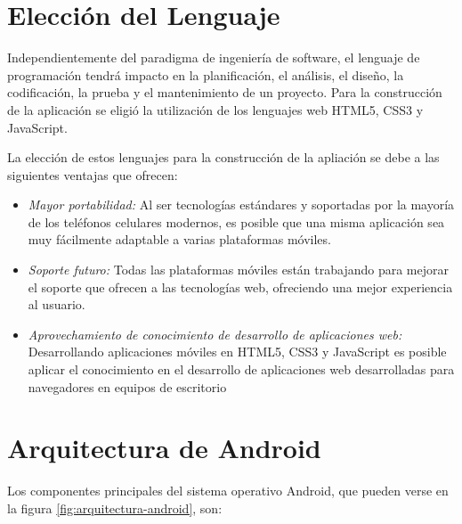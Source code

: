 \section{Elección del Lenguaje}

    Independientemente del paradigma de ingeniería de software, el lenguaje de programación tendrá impacto en la planificación, el análisis, el diseño, la codificación, la prueba y el mantenimiento de un proyecto. Para la construcción de la aplicación se eligió la utilización de los lenguajes web HTML5, CSS3 y JavaScript.

    La elección de estos lenguajes para la construcción de la apliación se debe a las siguientes ventajas que ofrecen:
    \begin{itemize}
        \item \emph{Mayor portabilidad:} Al ser tecnologías estándares y soportadas por la mayoría de los teléfonos celulares modernos, es posible que una misma aplicación sea muy fácilmente adaptable a varias plataformas móviles.
        \item \emph{Soporte futuro:} Todas las plataformas móviles están trabajando para mejorar el soporte que ofrecen a las tecnologías web, ofreciendo una mejor experiencia al usuario.
        \item \emph{Aprovechamiento de conocimiento de desarrollo de aplicaciones web:} Desarrollando aplicaciones móviles en \gls{HTML}5, \gls{CSS}3 y \gls{JavaScript} es posible aplicar el conocimiento en el desarrollo de aplicaciones web desarrolladas para navegadores en equipos de escritorio 
    \end{itemize}
   
\section{Arquitectura de Android}

Los componentes principales del sistema operativo Android, que pueden verse en la figura \ref{fig:arquitectura-android}, son:

